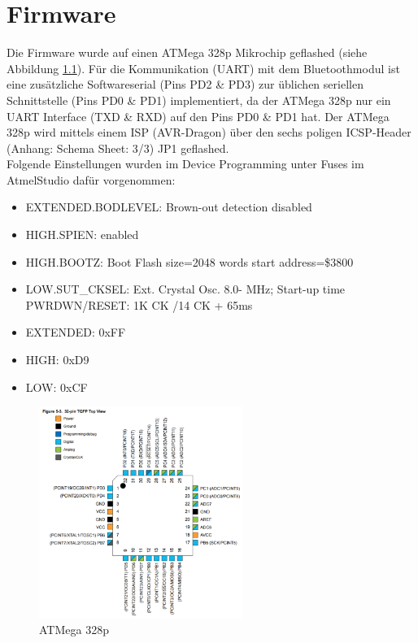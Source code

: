 \chapter{Firmware}
\label{Firmware}
\thispagestyle{fancy} 
Die Firmware wurde auf einen ATMega 328p Mikrochip geflashed (siehe Abbildung \ref{fig:ATMega328p}). Für die Kommunikation (UART) mit dem Bluetoothmodul ist eine zusätzliche Softwareserial (Pins PD2 \& PD3) zur üblichen seriellen Schnittstelle (Pins PD0 \& PD1) implementiert, da der ATMega 328p nur ein UART Interface (TXD \& RXD) auf den Pins PD0 \& PD1 hat. Der ATMega 328p wird mittels einem ISP (AVR-Dragon) über den sechs poligen ICSP-Header (Anhang: Schema Sheet: 3/3) JP1 geflashed.\\
Folgende Einstellungen wurden im Device Programming unter Fuses im AtmelStudio dafür vorgenommen:
\begin{itemize}
\item EXTENDED.BODLEVEL: Brown-out detection disabled
\item HIGH.SPIEN: enabled
\item HIGH.BOOTZ: Boot Flash size=2048 words start address=\$3800
\item LOW.SUT\_CKSEL: Ext. Crystal Osc. 8.0- MHz; Start-up time PWRDWN/RESET: 1K CK /14 CK + 65ms
\item EXTENDED: 0xFF
\item HIGH: 0xD9
\item LOW: 0xCF
\end{itemize}
\begin{figure}[h]
\centering
\includegraphics[width=0.59\textwidth]{Bilder/atmega328p.png} 
\caption[ATMega 328p]{ATMega 328p \cite{atmega328p}}
\label{fig:ATMega328p}
\end{figure}
